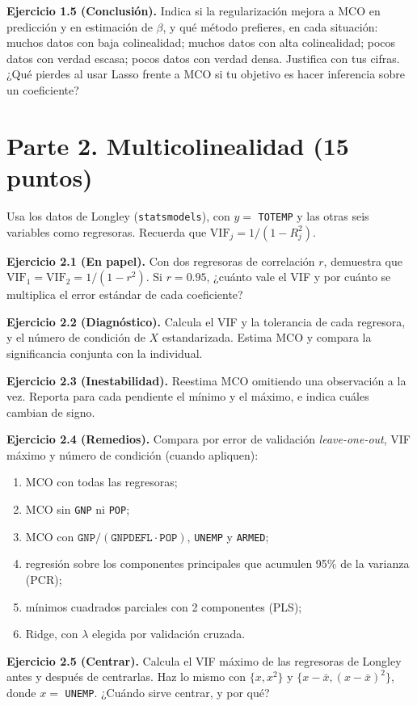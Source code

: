 \documentclass[11pt,letterpaper]{article}
\newcommand{\VIF}{\mathrm{VIF}}
\newcommand{\ejercicio}[1]{\par\medskip\textbf{Ejercicio #1.}\space}
\begin{document}
\ejercicio{1.5 (Conclusión)} Indica si la regularización mejora a MCO en predicción y en estimación de $\beta$, y qué método prefieres, en cada situación: muchos datos con baja colinealidad; muchos datos con alta colinealidad; pocos datos con verdad escasa; pocos datos con verdad densa. Justifica con tus cifras. ¿Qué pierdes al usar Lasso frente a MCO si tu objetivo es hacer inferencia sobre un coeficiente?

\section*{Parte 2. Multicolinealidad (15 puntos)}

Usa los datos de Longley (\texttt{statsmodels}), con $y=$ \texttt{TOTEMP} y las otras seis variables como regresoras. Recuerda que $\VIF_j=1/(1-R_j^2)$.

\ejercicio{2.1 (En papel)} Con dos regresoras de correlación $r$, demuestra que $\VIF_1=\VIF_2=1/(1-r^2)$. Si $r=0.95$, ¿cuánto vale el VIF y por cuánto se multiplica el error estándar de cada coeficiente?

\ejercicio{2.2 (Diagnóstico)} Calcula el VIF y la tolerancia de cada regresora, y el número de condición de $X$ estandarizada. Estima MCO y compara la significancia conjunta con la individual.

\ejercicio{2.3 (Inestabilidad)} Reestima MCO omitiendo una observación a la vez. Reporta para cada pendiente el mínimo y el máximo, e indica cuáles cambian de signo.

\ejercicio{2.4 (Remedios)} Compara por error de validación \emph{leave-one-out}, VIF máximo y número de condición (cuando apliquen):
\begin{enumerate}
  \item MCO con todas las regresoras;
  \item MCO sin \texttt{GNP} ni \texttt{POP};
  \item MCO con $\texttt{GNP}/(\texttt{GNPDEFL}\cdot\texttt{POP})$, \texttt{UNEMP} y \texttt{ARMED};
  \item regresión sobre los componentes principales que acumulen 95\% de la varianza (PCR);
  \item mínimos cuadrados parciales con 2 componentes (PLS);
  \item Ridge, con $\lambda$ elegida por validación cruzada.
\end{enumerate}

\ejercicio{2.5 (Centrar)} Calcula el VIF máximo de las regresoras de Longley antes y después de centrarlas. Haz lo mismo con $\{x,x^2\}$ y $\{x-\bar x,(x-\bar x)^2\}$, donde $x=$ \texttt{UNEMP}. ¿Cuándo sirve centrar, y por qué?
\end{document}

